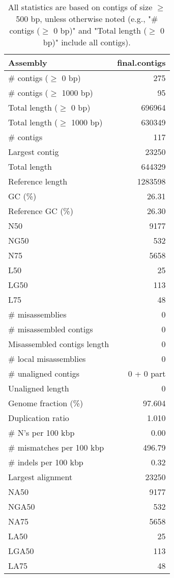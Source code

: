 \documentclass[12pt,a4paper]{article}
\begin{document}
\begin{table}[ht]
\begin{center}
\caption{All statistics are based on contigs of size $\geq$ 500 bp, unless otherwise noted (e.g., "\# contigs ($\geq$ 0 bp)" and "Total length ($\geq$ 0 bp)" include all contigs).}
\begin{tabular}{|l*{1}{|r}|}
\hline
Assembly & final.contigs \\ \hline
\# contigs ($\geq$ 0 bp) & 275 \\ \hline
\# contigs ($\geq$ 1000 bp) & 95 \\ \hline
Total length ($\geq$ 0 bp) & 696964 \\ \hline
Total length ($\geq$ 1000 bp) & 630349 \\ \hline
\# contigs & 117 \\ \hline
Largest contig & 23250 \\ \hline
Total length & 644329 \\ \hline
Reference length & 1283598 \\ \hline
GC (\%) & 26.31 \\ \hline
Reference GC (\%) & 26.30 \\ \hline
N50 & 9177 \\ \hline
NG50 & 532 \\ \hline
N75 & 5658 \\ \hline
L50 & 25 \\ \hline
LG50 & 113 \\ \hline
L75 & 48 \\ \hline
\# misassemblies & 0 \\ \hline
\# misassembled contigs & 0 \\ \hline
Misassembled contigs length & 0 \\ \hline
\# local misassemblies & 0 \\ \hline
\# unaligned contigs & 0 + 0 part \\ \hline
Unaligned length & 0 \\ \hline
Genome fraction (\%) & 97.604 \\ \hline
Duplication ratio & 1.010 \\ \hline
\# N's per 100 kbp & 0.00 \\ \hline
\# mismatches per 100 kbp & 496.79 \\ \hline
\# indels per 100 kbp & 0.32 \\ \hline
Largest alignment & 23250 \\ \hline
NA50 & 9177 \\ \hline
NGA50 & 532 \\ \hline
NA75 & 5658 \\ \hline
LA50 & 25 \\ \hline
LGA50 & 113 \\ \hline
LA75 & 48 \\ \hline
\end{tabular}
\end{center}
\end{table}
\end{document}
